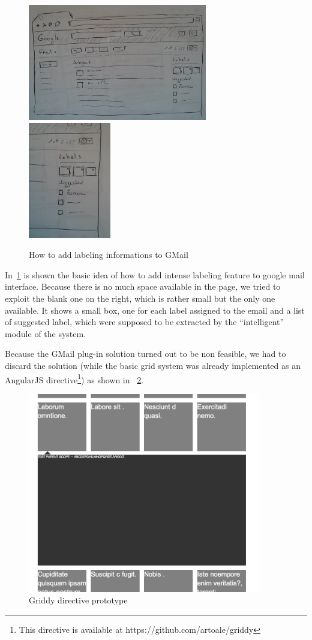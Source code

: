 \documentclass[a4paper,12pt]{report}
\begin{document}
\begin{figure}[H]
  \centering
  \includegraphics[height=2in]{old_label}
  \includegraphics[height=2in]{old_label_detail}
  \caption{How to add labeling informations to GMail}
  \label{fig:old2}
\end{figure}
In~\ref{fig:old2} is shown the basic idea of how to add intense labeling feature to google mail interface. Because there is no much space available in the page, we tried to exploit the blank one on the right, which is rather small but the only one available. It shows a small box, one for each label assigned to the email and a list of suggested label, which were supposed to be extracted by the ``intelligent'' module of the system.

Because the GMail plug-in solution turned out to be non feasible, we had to discard the solution (while the basic grid system was already implemented as an AngularJS directive\footnote{This directive is available at https://github.com/artoale/griddy}) as shown in ~\ref{fig:griddy}.
\begin{figure}[H]
  \centering
  \includegraphics[width=4in]{griddy}
  \caption{Griddy directive prototype}
  \label{fig:griddy}
\end{figure}
\end{document}
